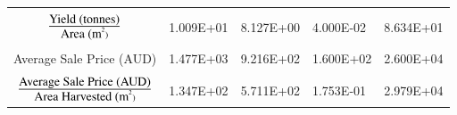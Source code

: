 \documentclass[review,12pt,authoryear]{elsarticle}
\begin{document}
\begin{linenumbers}
\begin{table}[]
\begin{tabular}{@{}cllll@{}}
          \multicolumn{1}{l}{} &  &  &  &  \\
          $\mbox{Yield (tonnes)}\over \mbox{Area (m}^2)$ & 1.009E+01 & 8.127E+00 & 4.000E-02 & 8.634E+01 \\
          \multicolumn{1}{l}{} &  &  &  &  \\
          {Average Sale Price (AUD)} & 1.477E+03 & 9.216E+02 & 1.600E+02 & 2.600E+04 \\
          \multicolumn{1}{l}{} &  &  &  &  \\
          $\mbox{Average Sale Price (AUD)} \over \mbox{Area Harvested (m}^2)$ & 1.347E+02 & 5.711E+02 & 1.753E-01 & 2.979E+04 \\ \bottomrule
          \end{tabular}
  \end{table}


\end{linenumbers}
\end{document}
